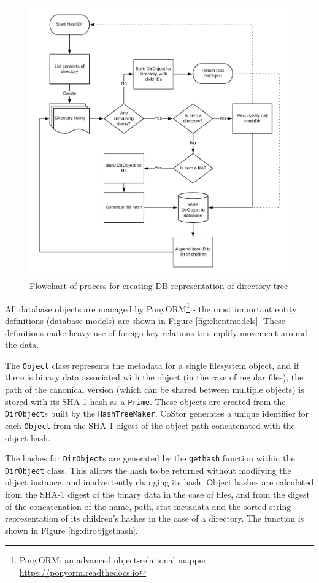 \documentclass[bsc,frontabs,twoside,singlespacing,parskip,deptreport]{infthesis}     %
\begin{document}
\begin{figure}[b]
	\includegraphics[width=\linewidth]{img/hasherflow.png}
	\caption{Flowchart of process for creating DB representation of directory tree}
	\label{fig:hasherflow}
\end{figure}

All database objects are managed by PonyORM\footnote{PonyORM: an advanced object-relational mapper \url{https://ponyorm.readthedocs.io}}
- the most important entity definitions (database models) are shown in Figure \ref{fig:clientmodels}.
These definitions make heavy use of foreign key relations to simplify movement around the data.

The \texttt{Object} class represents the metadata for a single filesystem object, and if there is 
binary data associated with the object (in the case of regular files), the path of the canonical
version (which can be shared between multiple objects) is stored with its SHA-1 hash as a \texttt{Prime}.
These objects are created from the \texttt{DirObject}s built by the \texttt{HashTreeMaker}. CoStor
generates a unique identifier for each \texttt{Object} from the SHA-1 digest of the object path concatenated 
with the object hash.

The hashes for \texttt{DirObject}s are generated by the \texttt{gethash} function within the \texttt{DirObject} 
class. This allows the hash to be returned without modifying the object instance, and inadvertently changing its 
hash. Object hashes are calculated from the SHA-1 digest of the binary data in the case of files, and from the 
digest of the concatenation of the name, path, stat metadata and the sorted string representation of its 
children's hashes in the case of a directory. The function is shown in Figure \ref{fig:dirobjgethash}.
\end{document}

